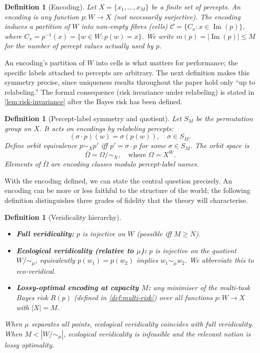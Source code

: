\documentclass[12pt]{article}
\newtheorem{definition}[theorem]{Definition}
\newcommand{\Obar}{\bar{\Omega}}
\newcommand{\im}{\operatorname{Im}}
\newcommand{\SM}{S_M}
\begin{document}
\begin{definition}[Encoding]\label{def:encoding}
Let $X = \{x_1, \ldots, x_M\}$ be a finite set of \emph{percepts}. An \emph{encoding} is any function $p\colon W \to X$ (not necessarily surjective). The encoding induces a partition of $W$ into non-empty fibres (cells) $\mathcal{C} = \{C_x : x \in \im(p)\}$, where $C_x = p^{-1}(x) = \{w \in W : p(w) = x\}$. We write $m(p) = |\im(p)| \le M$ for the number of percept values actually used by $p$.
\end{definition}

An encoding's partition of $W$ into cells is what matters for performance; the specific labels attached to percepts are arbitrary. The next definition makes this symmetry precise, since uniqueness results throughout the paper hold only ``up to relabeling.'' The formal consequence (risk invariance under relabeling) is stated in \cref{lem:risk-invariance} after the Bayes risk has been defined.

\begin{definition}[Percept-label symmetry and quotient]\label{def:quotient}
Let $\SM$ be the permutation group on $X$. It acts on encodings by relabeling percepts:
\begin{equation}
(\sigma \cdot p)(w) = \sigma(p(w)), \quad \sigma \in \SM.
\end{equation}
Define orbit equivalence $p \sim_X p'$ iff $p' = \sigma \cdot p$ for some $\sigma \in \SM$. The orbit space is
\begin{equation}
\Obar = \Omega / {\sim_X}, \quad \text{where } \Omega = X^W.
\end{equation}
Elements of $\Obar$ are encoding classes modulo percept-label names.
\end{definition}

With the encoding defined, we can state the central question precisely. An encoding can be more or less faithful to the structure of the world; the following definition distinguishes three grades of fidelity that the theory will characterise.

\begin{definition}[Veridicality hierarchy]\label{def:veridicality}
\leavevmode
\begin{itemize}
\item \textbf{Full veridicality:} $p$ is injective on $W$ (possible iff $M \ge N$).
\item \textbf{Ecological veridicality (relative to $\mu$):} $p$ is injective on the quotient $W/{\sim_\mu}$, equivalently $p(w_1) = p(w_2)$ implies $w_1 \sim_\mu w_2$. We abbreviate this to \emph{eco-veridical}.
\item \textbf{Lossy-optimal encoding at capacity $M$:} any minimiser of the multi-task Bayes risk $R(p)$ (defined in \cref{def:multi-risk}) over all functions $p\colon W \to X$ with $|X| = M$.
\end{itemize}
When $\mu$ separates all points, ecological veridicality coincides with full veridicality. When $M < |W/{\sim_\mu}|$, ecological veridicality is infeasible and the relevant notion is lossy optimality.
\end{definition}
\end{document}
